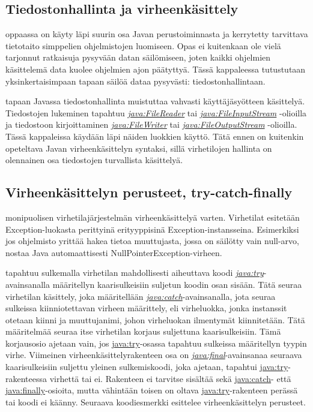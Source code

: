 \documentclass[a4paper,justified,notoc]{tufte-book}
\newcommand{\java}[1]{\underline{\gls{java:#1}}}
\newcommand{\newjava}[1]{\textit{\java{#1}}}
\begin{document}
\begin{fullwidth}
\chapter{Tiedostonhallinta ja virheenkäsittely}
\label{tiedostoista}

 oppaassa on käyty läpi suurin osa Javan perustoiminnasta ja kerrytetty
tarvittava tietotaito simppelien ohjelmistojen luomiseen. Opas ei kuitenkaan ole vielä tarjonnut
ratkaisuja pysyvään datan säilömiseen, joten kaikki ohjelmien käsittelemä data kuolee ohjelmien
ajon päätyttyä. Tässä kappaleessa tutustutaan yksinkertaisimpaan tapaan säilöä dataa pysyvästi:
tiedostonhallintaan. 

 tapaan Javassa tiedostonhallinta muistuttaa vahvasti
käyttäjäsyötteen käsittelyä. Tiedostojen lukeminen tapahtuu \newjava{FileReader} tai
\newjava{FileInputStream} -olioilla ja tiedostoon kirjoittaminen \newjava{FileWriter} tai
\newjava{FileOutputStream} -olioilla. Tässä kappaleissa käydään läpi näiden luokkien käyttö. Tätä
ennen on kuitenkin opeteltava Javan virheenkäsittelyn syntaksi, sillä virhetilojen hallinta on
olennainen osa tiedostojen turvallista käsittelyä.


\section{Virheenkäsittelyn perusteet, try-catch-finally}
\label{try-catch}

 monipuolisen virhetilajärjestelmän virheenkäsittelyä varten. Virhetilat
esitetään Exception-luokasta perittyinä erityyppisinä Exception-instansseina. Esimerkiksi jos
ohjelmisto yrittää hakea tietoa muuttujasta, jossa on säilötty vain null-arvo, nostaa Java
automaattisesti NullPointerException-virheen. 

 tapahtuu sulkemalla virhetilan mahdollisesti aiheuttava koodi
\newjava{try}-avainsanalla määritellyn kaarisulkeisiin suljetun koodin osan sisään. Tätä seuraa
virhetilan käsittely, joka määritellään \newjava{catch}-avainsanalla, jota seuraa sulkeissa
kiinniotettavan virheen määrittely, eli virheluokka, jonka instanssit otetaan kiinni ja
muuttujanimi, johon virheluokan ilmentymät kiinnitetään. Tätä määritelmää seuraa itse virhetilan
korjaus suljettuna kaarisulkeisiin. Tämä korjausosio ajetaan vain, jos \java{try}-osassa tapahtuu
sulkeissa määritellyn tyypin virhe. Viimeinen virheenkäsittelyrakenteen osa on
\newjava{final}-avainsanaa seuraava kaarisulkeisiin suljettu yleinen sulkemiskoodi, joka ajetaan,
tapahtui \java{try}-rakenteessa virhettä tai ei. Rakenteen ei tarvitse sisältää sekä \java{catch}-
että \java{finally}-osioita, mutta vähintään toisen on oltava \java{try}-rakenteen perässä tai
koodi ei käänny. Seuraava koodiesmerkki esittelee virheenkäsittelyn perusteet.


\end{fullwidth}
\end{document}
